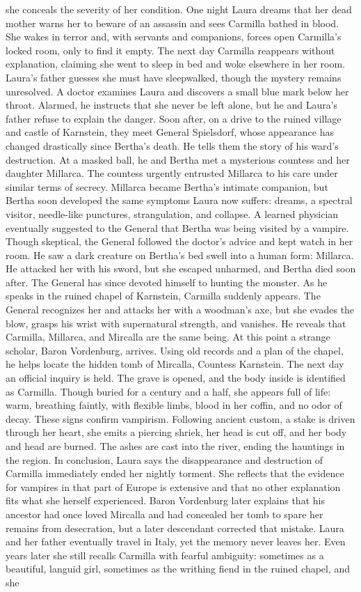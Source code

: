 \documentclass{article} %
\begin{document}
she conceals the severity of her condition. One night Laura dreams that her dead mother warns her to beware of an assassin and sees Carmilla bathed in blood. She wakes in terror and, with servants and companions, forces open Carmilla’s locked room, only to find it empty. The next day Carmilla reappears without explanation, claiming she went to sleep in bed and woke elsewhere in her room. Laura’s father guesses she must have sleepwalked, though the mystery remains unresolved. A doctor examines Laura and discovers a small blue mark below her throat. Alarmed, he instructs that she never be left alone, but he and Laura’s father refuse to explain the danger. Soon after, on a drive to the ruined village and castle of Karnstein, they meet General Spielsdorf, whose appearance has changed drastically since Bertha’s death. He tells them the story of his ward’s destruction. At a masked ball, he and Bertha met a mysterious countess and her daughter Millarca. The countess urgently entrusted Millarca to his care under similar terms of secrecy. Millarca became Bertha’s intimate companion, but Bertha soon developed the same symptoms Laura now suffers: dreams, a spectral visitor, needle-like punctures, strangulation, and collapse. A learned physician eventually suggested to the General that Bertha was being visited by a vampire. Though skeptical, the General followed the doctor’s advice and kept watch in her room. He saw a dark creature on Bertha’s bed swell into a human form: Millarca. He attacked her with his sword, but she escaped unharmed, and Bertha died soon after. \textcolor{skipred}{The General has since devoted himself to hunting the monster.} As he speaks in the ruined chapel of Karnstein, Carmilla suddenly appears. The General recognizes her and attacks her with a woodman’s axe, but she evades the blow, grasps his wrist with supernatural strength, and vanishes. He reveals that Carmilla, Millarca, and Mircalla are the same being. At this point a strange scholar, Baron Vordenburg, arrives. Using old records and a plan of the chapel, he helps locate the hidden tomb of Mircalla, Countess Karnstein. The next day an official inquiry is held. The grave is opened, and the body inside is identified as Carmilla. Though buried for a century and a half, she appears full of life: warm, breathing faintly, with flexible limbs, blood in her coffin, and no odor of decay. These signs confirm vampirism. Following ancient custom, a stake is driven through her heart, she emits a piercing shriek, her head is cut off, and her body and head are burned. The ashes are cast into the river, ending the hauntings in the region. In conclusion, Laura says the disappearance and destruction of Carmilla immediately ended her nightly torment. She reflects that the evidence for vampires in that part of Europe is extensive and that no other explanation fits what she herself experienced. Baron Vordenburg later explains that his ancestor had once loved Mircalla and had concealed her tomb to spare her remains from desecration, but a later descendant corrected that mistake. Laura and her father eventually travel in Italy, yet the memory never leaves her. Even years later she still recalls Carmilla with fearful ambiguity: sometimes as a beautiful, languid girl, sometimes as the writhing fiend in the ruined chapel, and she 
\end{document}
